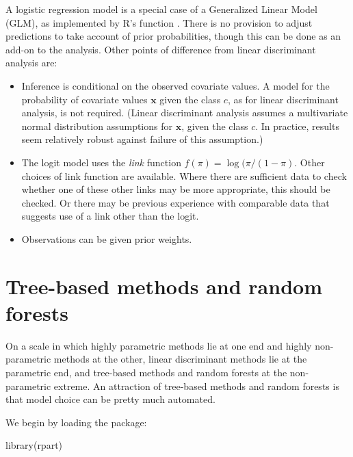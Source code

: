 A logistic regression model is a special case of a Generalized
Linear Model (GLM), as implemented by R's function . 
There is no provision to adjust predictions to take account of
prior probabilities, though this can be done as an add-on to the analysis.
Other points of difference from linear discriminant analysis are:

\begin{itemize}
\item Inference is conditional on the observed covariate values. A model
  for the probability of covariate values $\mathbf{x}$ given the class
  $c$, as for linear discriminant analysis, is not required.
  (Linear discriminant analysis assumes a multivariate normal distribution
  assumptions for $\mathbf{x}$, given the class $c$. In practice, results
  seem relatively robust against failure of this assumption.)
\item The logit model uses the {\em link} function $f(\pi) =
  \log(\pi/(1-\pi)$. Other choices of link function are available.
  Where there are sufficient data to check whether one of these other
  links may be more appropriate, this should be checked.  Or there may
  be previous experience with comparable data that suggests use of a
  link other than the logit.
\item Observations can be given prior weights.
\end{itemize}

\section{Tree-based methods and random forests}
On a scale in which highly parametric methods lie at one end and
highly non-parametric methods at the other, linear discriminant
methods lie at the parametric end, and tree-based methods and random
forests at the non-parametric extreme.  An attraction of tree-based
methods and random forests is that model choice can be pretty much
automated.

We begin by loading the  package:
\begin{Schunk}
\begin{Sinput}
library(rpart)
\end{Sinput}
\end{Schunk}

